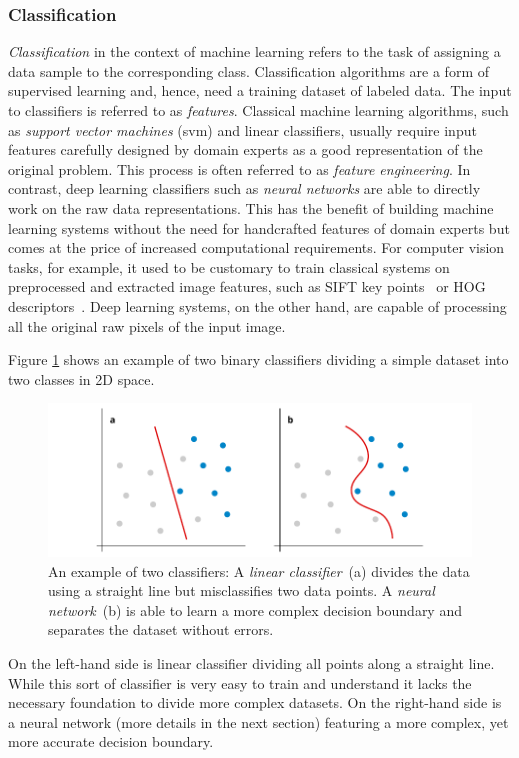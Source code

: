 \subsubsection{Classification}
\emph{Classification} in the context of machine learning refers to the task of assigning a data sample to the corresponding class. Classification algorithms are a form of supervised learning and, hence, need a training dataset of labeled data. The input to classifiers is referred to as \emph{features}. Classical machine learning algorithms, such as \emph{support vector machines} (\ac{svm}) and linear classifiers, usually require input features carefully designed by domain experts as a good representation of the original problem. This process is often referred to as \emph{feature engineering}. In contrast, deep learning classifiers such as \emph{neural networks} are able to directly work on the raw data representations. This has the benefit of building machine learning systems without the need for handcrafted features of domain experts but comes at the price of increased computational requirements. For computer vision tasks, for example, it used to be customary to train classical systems on preprocessed and extracted image features, such as SIFT key points~\cite{lowe1999object} or HOG descriptors~\cite{dalal2005histograms}. Deep learning systems, on the other hand, are capable of processing all the original raw pixels of the input image.


Figure \ref{fig:classifiers} shows an example of two binary classifiers dividing a simple dataset into two classes in 2D space.
%
	\begin{figure}[tp]
  		\centering
    	\includegraphics[width=\textwidth, keepaspectratio]{img/classifiers.pdf}
    	\caption{An example of two classifiers: A \emph{linear classifier}~(a) divides the data using a straight line but misclassifies two data points. A \emph{neural network}~(b) is able to learn a more complex decision boundary and separates the dataset without errors.}
    	\label{fig:classifiers}
	\end{figure}
%
On the left-hand side is linear classifier dividing all points along a straight line. While this sort of classifier is very easy to train and understand it lacks the necessary foundation to divide more complex datasets. On the right-hand side is a neural network (more details in the next section) featuring a more complex, yet more accurate decision boundary.

